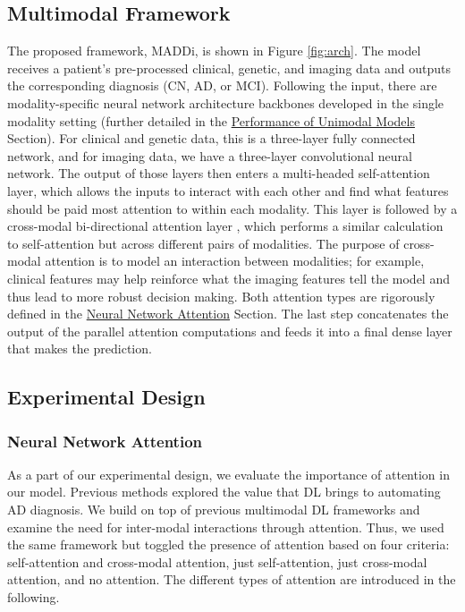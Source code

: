 \documentclass[11pt]{article}
\begin{document}
\subsection*{Multimodal Framework}
\label{section:mm_frame}
The proposed framework, MADDi, is shown in Figure \ref{fig:arch}. The model receives a patient's pre-processed clinical, genetic, and imaging data and outputs the corresponding diagnosis (CN, AD, or MCI). Following the input, there are modality-specific neural network architecture backbones developed in the single modality setting (further detailed in the {\hyperref[subsection:uni_frame]{Performance of Unimodal Models} Section)}. For clinical and genetic data, this is a three-layer fully connected network, and for imaging data, we have a three-layer convolutional neural network. The output of those layers then enters a multi-headed self-attention layer, which allows the inputs to interact with each other and find what features should be paid most attention to within each modality. This layer is followed by a cross-modal bi-directional attention layer \cite{Tan2019LXMERTLC}, which performs a similar calculation to self-attention but across different pairs of modalities. The purpose of cross-modal attention is to model an interaction between modalities; for example, clinical features may help reinforce what the imaging features tell the model and thus lead to more robust decision making. Both attention types are rigorously defined in the {\hyperref[section:att]{Neural Network Attention} Section}. The last step concatenates the output of the parallel attention computations and feeds it into a final dense layer that makes the prediction. 
\subsection*{Experimental Design}

\subsubsection*{Neural Network Attention}
\label{section:att}

As a part of our experimental design, we evaluate the importance of attention in our model. Previous methods \cite{ELSAPPAGH2020197,ABUHMED2021106688, venugopalan2021multimodal} explored the value that DL brings to automating AD diagnosis. We build on top of previous multimodal DL frameworks and examine the need for inter-modal interactions through attention. Thus, we used the same framework but toggled the presence of attention based on four criteria: self-attention and cross-modal attention, just self-attention, just cross-modal attention, and no attention. The different types of attention are introduced in the following. 
\end{document}
